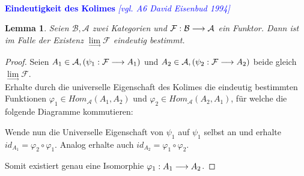 \documentclass[10pt,a4paper]{report}
\newcommand{\comment}[1]{}
\newcommand{\ModulsOfDifferenzials}{David Eisenbud 1994}
\newcounter{Aussage}[chapter]
\newtheorem{lemma}[Aussage]{Lemma}
\newcommand{\functionfront}[3]{\nolinebreak{#1:#2 \longrightarrow #3}}
\newcommand{\colimes}[0]{\lim\limits_{ \longrightarrow }}
\begin{document}
\ \\
\textcolor{blue}{\textbf{Eindeutigkeit des Kolimes} \textit{[vgl. A6 \ModulsOfDifferenzials]}}
\begin{lemma}\comment{\label{Eindeutigkeit des Kolimes}}
Seien $\mathcal{B},\mathcal{A}$ zwei Kategorien und $\functionfront{\mathcal{F}}{\mathcal{B}}{\mathcal{A}}$ ein Funktor. Dann ist im Falle der Existenz $\colimes \mathcal{F}$ eindeutig bestimmt.
\end{lemma}
\begin{proof}
Seien $A_1 \in \mathcal{A}, (\functionfront{\psi_1}{\mathcal{F}}{A_1}) $ und $A_2 \in \mathcal{A} , (\functionfront{\psi_2}{\mathcal{F}}{A_2}) $ beide gleich $\colimes \mathcal{F}$.\\
Erhalte durch die universelle Eigenschaft des Kolimes die eindeutig bestimmten Funktionen $\varphi_1 \in Hom_{\mathcal{A}}(A_1,A_2)$ und $\varphi_2 \in Hom_{\mathcal{A}}(A_2,A_1)$, für welche die folgende Diagramme kommutieren:
\begin{center}
\end{center}
\begin{flushleft}
Wende nun die Universelle Eigenschaft von $\psi_1$ auf $\psi_1$ selbst an und erhalte $id_{A_1} = \varphi_2 \circ \varphi_1$. Analog erhalte auch $id_{A_2} = \varphi_1 \circ \varphi_2$.
\end{flushleft}
\begin{center}
\end{center}
Somit existiert genau eine Isomorphie $\functionfront{\varphi_1}{A_1}{A_2}$.
\end{proof}
\end{document}
